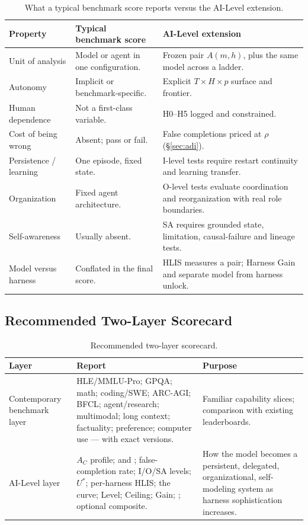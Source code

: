 \begin{table}[!htbp]
\centering\small
\begin{tabularx}{\textwidth}{@{}lYY@{}}
\toprule
Property & Typical benchmark score & AI-Level extension \\
\midrule
Unit of analysis & Model or agent in one configuration. & Frozen pair $A(m,h)$, plus the same model across a ladder. \\
Autonomy & Implicit or benchmark-specific. & Explicit $T \times H \times p$ surface and frontier. \\
Human dependence & Not a first-class variable. & H0--H5 logged and constrained. \\
Cost of being wrong & Absent; pass or fail. & False completions priced at $\rho$ (\S\ref{sec:adi}). \\
Persistence / learning & One episode, fixed state. & I-level tests require restart continuity and learning transfer. \\
Organization & Fixed agent architecture. & O-level tests evaluate coordination and reorganization with real role boundaries. \\
Self-awareness & Usually absent. & SA requires grounded state, limitation, causal-failure and lineage tests. \\
Model versus harness & Conflated in the final score. & HLIS measures a pair; Harness Gain and \rhov{} separate model from harness unlock. \\
\bottomrule
\end{tabularx}
\caption{What a typical benchmark score reports versus the AI-Level extension.}
\label{tab:hilext}
\end{table}

\subsection{Recommended Two-Layer Scorecard}

\begin{table}[!htbp]
\centering\small
\begin{tabularx}{\textwidth}{@{}lYY@{}}
\toprule
Layer & Report & Purpose \\
\midrule
Contemporary benchmark layer & HLE/MMLU-Pro; GPQA; math; coding/SWE; ARC-AGI; BFCL; agent/research; multimodal; long context; factuality; preference; computer use --- with exact versions. & Familiar capability slices; comparison with existing leaderboards. \\
AI-Level layer & $A_C$ profile; \SA{} and \FA{}; false-completion rate; I/O/SA levels; $U^{*}$; per-harness HLIS; the curve; Level; Ceiling; Gain; \rhov{}; optional composite. & How the model becomes a persistent, delegated, organizational, self-modeling system as harness sophistication increases. \\
\bottomrule
\end{tabularx}
\caption{Recommended two-layer scorecard.}
\label{tab:twolayer}
\end{table}

